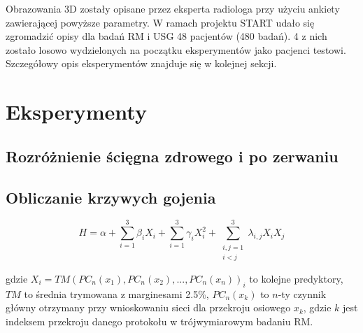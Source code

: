 Obrazowania 3D zostały opisane przez eksperta radiologa przy użyciu ankiety zawierającej powyższe parametry. W ramach projektu START udało się zgromadzić opisy dla badań RM i USG 48 pacjentów (480 badań). 4 z nich zostało losowo wydzielonych na początku eksperymentów jako pacjenci testowi. Szczegółowy opis eksperymentów znajduje się w kolejnej sekcji.

\section{Eksperymenty}
\subsection{Rozróżnienie ścięgna zdrowego i po zerwaniu}
\subsection{Obliczanie krzywych gojenia}
\begin{equation}
H = \alpha + \sum_{i=1}^{3}\beta_{i}X_{i} + \sum_{i=1}^{3}\gamma_{i}X_{i}^{2} +
\sum_{\substack{i, j = 1\\ i < j}}^{3}\lambda_{i,j}X_{i}X_{j}
\end{equation}

gdzie $X_i = TM(PC_n(x_1), PC_n(x_2),..., PC_n(x_n))_{i}$ to kolejne predyktory, $TM$ to średnia trymowana z marginesami 2.5\%, $PC_n(x_k)$ to $n$-ty czynnik główny otrzymany przy wnioskowaniu sieci dla przekroju osiowego $x_k$, gdzie $k$ jest indeksem przekroju danego protokołu w trójwymiarowym badaniu RM.

